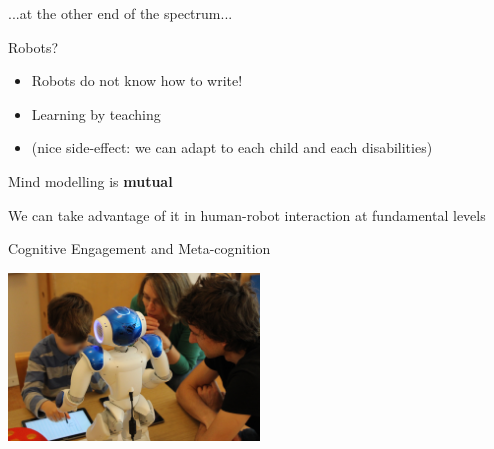 \documentclass[compress]{beamer}
\begin{document}
 \begin{frame}[plain]{}
     ...at the other end of the spectrum...
 \end{frame}






\begin{frame}{Robots?}
    \begin{itemize}
        \item<1-> Robots do not know how to write!
        \item<2-> Learning by teaching
        \item<3-> (nice side-effect: we can adapt to each child and each disabilities)
    \end{itemize}
\end{frame}


\begin{frame}[plain]{}
    \centering
    Mind modelling is {\bf mutual}

    We can take advantage of it in human-robot interaction at fundamental levels

\end{frame}

\begin{frame}{Cognitive Engagement and Meta-cognition}

    \begin{flushright}
        \includegraphics[width=0.5\textwidth]{cowriter/henry}
    \end{flushright}

\end{frame}
\end{document}
